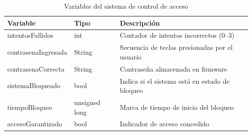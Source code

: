 
\begin{table}[h]
\centering
\caption{Variables del sistema de control de acceso}
\label{tab:Tabla_1_R1}
\footnotesize
\setlength{\tabcolsep}{4pt}
\renewcommand{\arraystretch}{1.5}
    
    \begin{tabularx}{\columnwidth}{|>{\raggedright\arraybackslash}p{3cm}|>{\centering\arraybackslash}p{1.5cm}|X|}
        \hline
        \textbf{Variable} & \textbf{Tipo} & \textbf{Descripción} \\
        
        \hline
        intentosFallidos & int & Contador de intentos incorrectos (0--3) \\ 
        
        \hline
        contrasenaIngresada & String & Secuencia de teclas presionadas por el usuario \\ 
        
        \hline
        contrasenaCorrecta & String & Contraseña almacenada en firmware \\ 
        
        \hline
        sistemaBloqueado & bool & Indica si el sistema está en estado de bloqueo \\ 
        
        \hline
        tiempoBloqueo & unsigned long & Marca de tiempo de inicio del bloqueo \\ 
        
        \hline
        accesoGarantizado & bool & Indicador de acceso concedido \\ \hline
\end{tabularx}
\end{table}